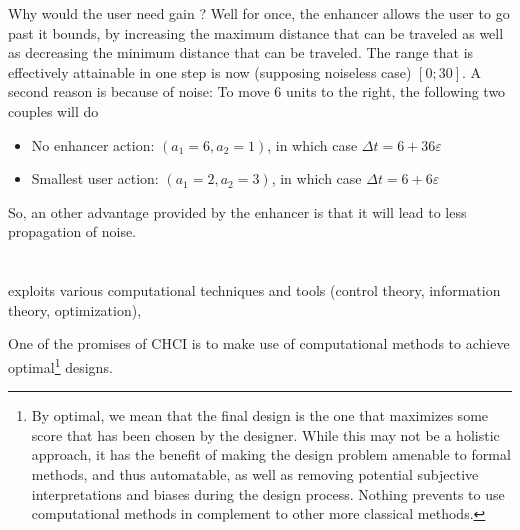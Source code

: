 \documentclass[12pt,a4paper]{article}
\begin{document}
Why would the user need gain ? Well for once, the enhancer allows the user to go past it bounds, by increasing the maximum distance that can be traveled as well as decreasing the minimum distance that can be traveled. The range that is effectively attainable in one step is now (supposing noiseless case) $[0;30]$.
A second reason is because of noise: To move 6 units to the right, the following two couples will do 
	
\begin{itemize}
	\item No enhancer action: $(a_1 = 6, a_2 = 1)$, in which case $\Delta t = 6 + 36 \varepsilon$
	\item Smallest user action: $(a_1 = 2, a_2 = 3)$, in which case $\Delta t = 6 + 6\varepsilon$
\end{itemize}		
\noindent So, an other advantage provided by the enhancer is that it will lead to less propagation of noise.

\section{}

exploits various computational techniques and tools (control theory, information theory, optimization), 





One of the promises of CHCI is to make use of computational methods to achieve optimal\footnote{By optimal, we mean that the final design is the one that maximizes some score that has been chosen by the designer. While this may not be a holistic approach, it has the benefit of making the design problem amenable to formal methods, and thus automatable, as well as removing potential subjective interpretations and biases during the design process. Nothing prevents to use computational methods in complement to other more classical methods.} designs.
\end{document}
